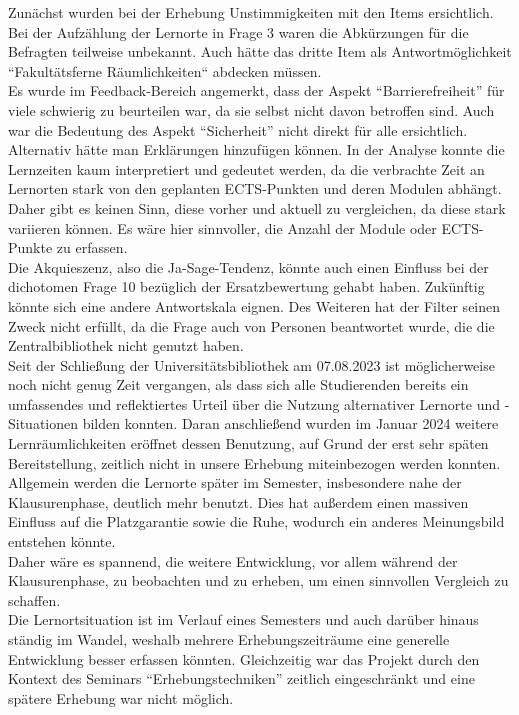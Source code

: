 \documentclass[11pt, a4paper]{article}
\begin{document}
Zunächst wurden bei der Erhebung Unstimmigkeiten mit den Items ersichtlich.
Bei der Aufzählung der Lernorte in Frage 3 waren die Abkürzungen für die Befragten teilweise unbekannt. Auch hätte das dritte Item als Antwortmöglichkeit “Fakultätsferne Räumlichkeiten“ abdecken müssen. \\
Es wurde im Feedback-Bereich angemerkt, dass der Aspekt “Barrierefreiheit” für viele schwierig zu beurteilen war, da sie selbst nicht davon betroffen sind. Auch war die Bedeutung des Aspekt “Sicherheit” nicht direkt für alle ersichtlich. Alternativ hätte man Erklärungen hinzufügen können.
In der Analyse konnte die Lernzeiten kaum interpretiert und gedeutet werden, da die verbrachte Zeit an Lernorten stark von den geplanten ECTS-Punkten und deren Modulen abhängt. Daher gibt es keinen Sinn, diese vorher und aktuell zu vergleichen, da diese stark variieren können. Es wäre hier sinnvoller, die Anzahl der Module oder ECTS-Punkte zu erfassen.\\
Die Akquieszenz, also die Ja-Sage-Tendenz, könnte auch einen Einfluss bei der dichotomen Frage 10 bezüglich der Ersatzbewertung gehabt haben. Zukünftig könnte sich eine andere Antwortskala eignen. Des Weiteren hat der Filter seinen Zweck nicht erfüllt, da die Frage auch von Personen beantwortet wurde, die die Zentralbibliothek nicht genutzt haben.\\
Seit der Schließung der Universitätsbibliothek am 07.08.2023 ist möglicherweise noch nicht genug Zeit vergangen, als dass sich alle Studierenden bereits ein umfassendes und reflektiertes Urteil über die Nutzung alternativer Lernorte und -Situationen bilden konnten. 
Daran anschließend wurden im Januar 2024 weitere Lernräumlichkeiten eröffnet dessen Benutzung, auf Grund der erst sehr späten Bereitstellung, zeitlich nicht in unsere Erhebung miteinbezogen werden konnten. \\
Allgemein werden die Lernorte später im Semester, insbesondere nahe der Klausurenphase, deutlich mehr benutzt. Dies hat außerdem einen massiven Einfluss auf die Platzgarantie sowie die Ruhe, wodurch ein anderes Meinungsbild entstehen könnte.\\
Daher wäre es spannend, die weitere Entwicklung, vor allem während der Klausurenphase, zu beobachten und zu erheben, um einen sinnvollen Vergleich zu schaffen.\\
Die Lernortsituation ist im Verlauf eines Semesters und auch darüber hinaus ständig im Wandel, weshalb mehrere Erhebungszeiträume eine generelle Entwicklung besser erfassen könnten. Gleichzeitig war das Projekt durch den Kontext des Seminars “Erhebungstechniken” zeitlich eingeschränkt und eine spätere Erhebung war nicht möglich.\\
\end{document}
